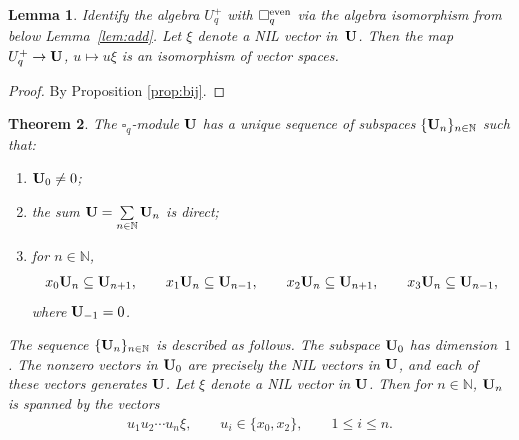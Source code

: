 \documentclass[pdftex]{sigma}
\numberwithin{equation}{section}
\newtheorem{Theorem}{Theorem}[section]
\newtheorem{Lemma}[Theorem]{Lemma}
\begin{document}
\begin{Lemma}Identify the algebra $U^+_q$ with $\square^{\rm even}_q$ via the algebra isomorphism from
below Lemma~{\rm \ref{lem:add}}. Let $\xi $ denote a NIL vector in~${\bf U}$. Then the map
$U^+_q \to {\bf U}$, $u \mapsto u \xi$ is an isomorphism of vector spaces.
\end{Lemma}
\begin{proof} By Proposition \ref{prop:bij}.
\end{proof}

\begin{Theorem}The $\square_q$-module ${\bf U}$ has a unique sequence of subspaces
$\lbrace {\bf U}_n\rbrace_{n \in \mathbb N}$ such that:
\begin{enumerate}\itemsep=0pt
\item[\rm (i)] ${\bf U}_0 \not=0$;
\item[\rm (ii)] the sum ${\bf U} = \sum\limits_{n \in \mathbb N} {\bf U}_n$ is direct;
\item[\rm (iii)] for $n \in \mathbb N$,
\begin{gather*}
x_0 {\bf U}_n \subseteq {\bf U}_{n+1}, \qquad
x_1 {\bf U}_n \subseteq {\bf U}_{n-1}, \qquad
x_2 {\bf U}_n \subseteq {\bf U}_{n+1}, \qquad
x_3 {\bf U}_n \subseteq {\bf U}_{n-1},
\end{gather*}
where ${\bf U}_{-1}=0$.
\end{enumerate}
The sequence $\lbrace {\bf U}_n\rbrace_{n \in \mathbb N}$ is described as follows. The subspace
 ${\bf U}_0$ has dimension~$1$. The nonzero vectors in ${\bf U}_0$ are precisely the NIL vectors
in ${\bf U}$, and each of these vectors
generates ${\bf U}$.
Let $\xi$ denote a NIL vector in $\bf U$.
Then for $n \in \mathbb N$,
 ${\bf U}_n$ is spanned by
the vectors
\begin{gather}\label{eq:vectorlist}
u_1u_2\cdots u_n \xi,\qquad u_i \in \lbrace x_0, x_2\rbrace, \qquad 1 \leq i \leq n.
\end{gather}
\end{Theorem}
\end{document}
